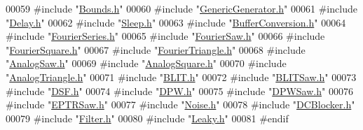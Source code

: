 \begin{DoxyCode}
00059 \textcolor{preprocessor}{#include "\hyperlink{_bounds_8h}{Bounds.h}"}
00060 \textcolor{preprocessor}{#include "\hyperlink{_generic_generator_8h}{GenericGenerator.h}"}
00061 \textcolor{preprocessor}{#include "\hyperlink{_delay_8h}{Delay.h}"}
00062 \textcolor{preprocessor}{#include "\hyperlink{_sleep_8h}{Sleep.h}"}
00063 \textcolor{preprocessor}{#include "\hyperlink{_buffer_conversion_8h}{BufferConversion.h}"}
00064 \textcolor{preprocessor}{#include "\hyperlink{_fourier_series_8h}{FourierSeries.h}"}
00065 \textcolor{preprocessor}{#include "\hyperlink{_fourier_saw_8h}{FourierSaw.h}"}
00066 \textcolor{preprocessor}{#include "\hyperlink{_fourier_square_8h}{FourierSquare.h}"}
00067 \textcolor{preprocessor}{#include "\hyperlink{_fourier_triangle_8h}{FourierTriangle.h}"}
00068 \textcolor{preprocessor}{#include "\hyperlink{_analog_saw_8h}{AnalogSaw.h}"}
00069 \textcolor{preprocessor}{#include "\hyperlink{_analog_square_8h}{AnalogSquare.h}"}
00070 \textcolor{preprocessor}{#include "\hyperlink{_analog_triangle_8h}{AnalogTriangle.h}"}
00071 \textcolor{preprocessor}{#include "\hyperlink{_b_l_i_t_8h}{BLIT.h}"}
00072 \textcolor{preprocessor}{#include "\hyperlink{_b_l_i_t_saw_8h}{BLITSaw.h}"}
00073 \textcolor{preprocessor}{#include "\hyperlink{_d_s_f_8h}{DSF.h}"}
00074 \textcolor{preprocessor}{#include "\hyperlink{_d_p_w_8h}{DPW.h}"}
00075 \textcolor{preprocessor}{#include "\hyperlink{_d_p_w_saw_8h}{DPWSaw.h}"}
00076 \textcolor{preprocessor}{#include "\hyperlink{_e_p_t_r_saw_8h}{EPTRSaw.h}"}
00077 \textcolor{preprocessor}{#include "\hyperlink{_noise_8h}{Noise.h}"}
00078 \textcolor{preprocessor}{#include "\hyperlink{_d_c_blocker_8h}{DCBlocker.h}"}
00079 \textcolor{preprocessor}{#include "\hyperlink{_filter_8h}{Filter.h}"}
00080 \textcolor{preprocessor}{#include "\hyperlink{_leaky_8h}{Leaky.h}"}
00081 \textcolor{preprocessor}{#endif}
\end{DoxyCode}
